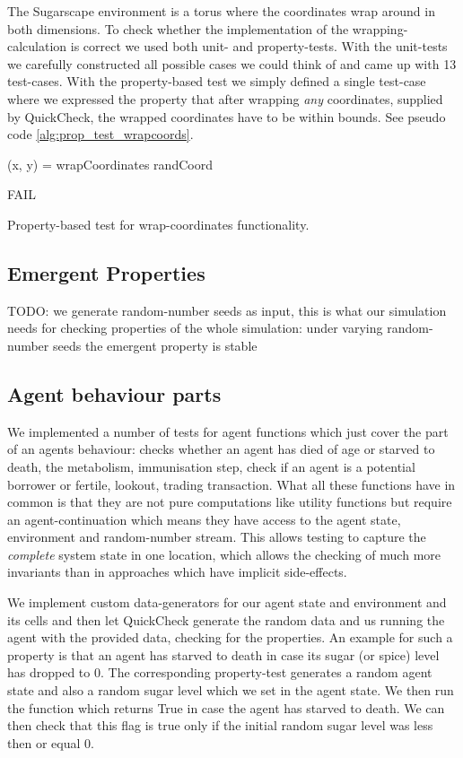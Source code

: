 The Sugarscape environment is a torus where the coordinates wrap around in both dimensions. To check whether the implementation of the wrapping-calculation is correct we used both unit- and property-tests. With the unit-tests we carefully constructed all possible cases we could think of and came up with 13 test-cases. With the property-based test we simply defined a single test-case where we expressed the property that after wrapping \textit{any} coordinates, supplied by QuickCheck, the wrapped coordinates have to be within bounds. See pseudo code \ref{alg:prop_test_wrapcoords}.

\begin{algorithm}
(x, y) = wrapCoordinates randCoord\;

 {
  FAIL\;
}
\caption{Property-based test for wrap-coordinates functionality.}
\end{algorithm}
\label{alg:prop_test_wrapcoords}

\subsection{Emergent Properties}
TODO: we generate random-number seeds as input, this is what our simulation needs for checking properties of the whole simulation: under varying random-number seeds the emergent property is stable

\subsection{Agent behaviour parts}
We implemented a number of tests for agent functions which just cover the part of an agents behaviour: checks whether an agent has died of age or starved to death, the metabolism, immunisation step, check if an agent is a potential borrower or fertile, lookout, trading transaction. What all these functions have in common is that they are not pure computations like utility functions but require an agent-continuation which means they have access to the agent state, environment and random-number stream. This allows testing to capture the \textit{complete} system state in one location, which allows the checking of much more invariants than in approaches which have implicit side-effects.

We implement custom data-generators for our agent state and environment and its cells and then let QuickCheck generate the random data and us running the agent with the provided data, checking for the properties. An example for such a property is that an agent has starved to death in case its sugar (or spice) level has dropped to 0. The corresponding property-test generates a random agent state and also a random sugar level which we set in the agent state. We then run the function which returns True in case the agent has starved to death. We can then check that this flag is true only if the initial random sugar level was less then or equal 0.

